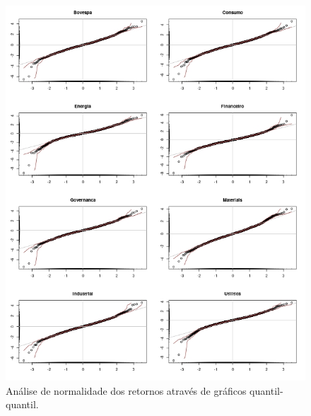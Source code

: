 \documentclass{article}
\begin{document}
	\begin{figure}[H]
		\centering
		\includegraphics[width=1\linewidth]{figs/artigo-qqplots}
		\caption{Análise de normalidade dos retornos através de gráficos quantil-quantil.}
		\label{fig:artigo-qqplots}
	\end{figure}
\end{document}
